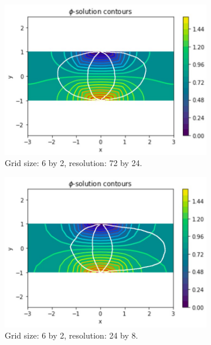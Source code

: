\begin{figure}
	\centering
	\begin{subfigure}[b]{0.49\linewidth}
		\centering
		\includegraphics[width=\linewidth]{Materials/627224}
		\caption{Grid size: 6 by 2, resolution: 72 by 24.}
	\end{subfigure}
	\hfill
	\begin{subfigure}[b]{0.49\linewidth}
		\centering
		\includegraphics[width=\linewidth]{Materials/62248}
		\caption{Grid size: 6 by 2, resolution: 24 by 8.}
	\end{subfigure}
	\\
	\begin{subfigure}[b]{0.49\linewidth}
		\centering

\end{subfigure}
\end{figure}
